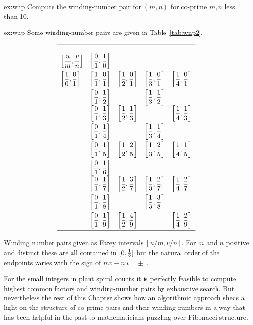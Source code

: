 \begin{jExercise}{ex:wnp}
	Compute the winding-number pair for $(m,n)$ for co-prime $m,n$ less than 10. 
\end{jExercise}
\begin{jAnswer}{ex:wnp}
	Some winding-number pairs are given in Table~\ref{tab:wnp2}.
	\begin{table}
	\begin{equation*}
		\begin{array}{lllll}
			\hline
			\\
			\left[\displaystyle\frac{u}{m},\frac{v}{n}\right]
			&\left[\displaystyle\frac{0}{1},\frac{1}{0}\right]&   &  &   \\[2ex]
			\left[\displaystyle\frac{ 1}{0},\frac{0}{1}\right] &  \left[\displaystyle\frac{1}{1},\frac{0}{1}\right]  &  \left[\displaystyle\frac{1}{2},\frac{0}{1}\right]  & \left[\displaystyle\frac{1}{3},\frac{0}{1}\right]& \left[\displaystyle\frac{1}{4},\frac{0}{1}\right] \\[2ex]
			&  \left[\displaystyle\frac{0}{1},\frac{1}{2}\right]&  & \left[\displaystyle\frac{1}{3},\frac{1}{2}\right] &  \\
			&  \left[\displaystyle\frac{0}{1},\frac{1}{3}\right] & \left[\displaystyle\frac{1}{2},\frac{1}{3}\right] &  & \left[\displaystyle\frac{1}{4},\frac{1}{3}\right] \\[2ex]
			&  \left[\displaystyle\frac{0}{1},\frac{1}{4}\right] &  & \left[\displaystyle\frac{1}{3},\frac{1}{4}\right] & \\[2ex]
			&  \left[\displaystyle\frac{0}{1},\frac{1}{5}\right] &\left[\displaystyle\frac{1}{2},\frac{2}{5}\right] & \left[\displaystyle\frac{1}{3},\frac{2}{5}\right] &\left[\displaystyle\frac{1}{4},\frac{1}{5}\right] \\[2ex]
			&  \left[\displaystyle\frac{0}{1},\frac{1}{6}\right] &  &  &  \\
			&  \left[\displaystyle\frac{0}{1},\frac{1}{7}\right] &\left[\displaystyle\frac{1}{2},\frac{3}{7}\right]& \left[\displaystyle\frac{1}{3},\frac{2}{7}\right] & \left[\displaystyle\frac{1}{4},\frac{2}{7}\right]  \\[2ex]
			&  \left[\displaystyle\frac{0}{1},\frac{1}{8}\right] &  & \left[\displaystyle\frac{1}{3},\frac{3}{8}\right] &  \\[2ex]
			&  \left[\displaystyle\frac{0}{1},\frac{1}{9}\right] & \left[\displaystyle\frac{1}{2},\frac{4}{9}\right] &  & \left[\displaystyle\frac{1}{4},\frac{2}{9}\right]  \\[2ex]
			\hline
		\end{array}
	\end{equation*}
		\caption{Winding number pairs given as Farey intervals $[u/m,v/n]$. For $m$ and $n$ positive and distinct these are all contained in $[0,\textstyle{\frac{1}{2}}]$ but the natural order of the endpoints varies with the sign of $mv-nu=\pm 1$.}
		\label{tab:wnp2}
	\end{table}
\end{jAnswer}



For the small integers in plant spiral counts it is perfectly feasible to compute highest common factors and winding-number pairs by exhaustive search. But nevertheless the rest of this Chapter shows how an algorithmic approach sheds a light on the structure of co-prime pairs and their winding-numbers in a way that has been helpful in the past to mathematicians puzzling over Fibonacci structure. 


